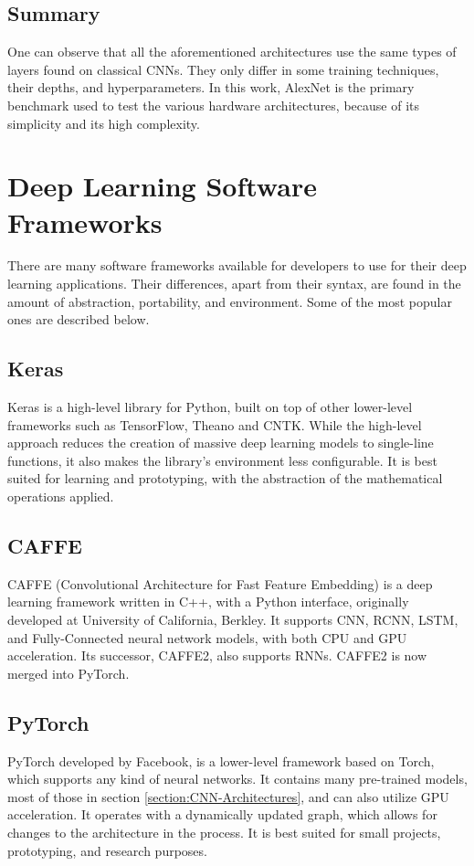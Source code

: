 \subsection{Summary}
One can observe that all the aforementioned architectures use the same types of layers found on classical CNNs. They only differ in some training techniques, their depths, and hyperparameters. In this work, AlexNet is the primary benchmark used to test the various hardware architectures, because of its simplicity and its high complexity.

\section{Deep Learning Software Frameworks}
There are many software frameworks available for developers to use for their deep learning applications. Their differences, apart from their syntax, are found in the amount of abstraction, portability, and environment. Some of the most popular ones are described below.

\subsection{Keras}
Keras \cite{Keras-Official-site} \cite{Keras-Wikipedia} is a high-level library for Python, built on top of other lower-level frameworks such as TensorFlow, Theano and CNTK. While the high-level approach reduces the creation of massive deep learning models to single-line functions, it also makes the library's environment less configurable. It is best suited for learning and prototyping, with the abstraction of the mathematical operations applied.

\subsection{CAFFE}
CAFFE (Convolutional Architecture for Fast Feature Embedding) \cite{Caffe-Convolutional-Architecture-for-Fast-Feature-Embedding} \cite{Caffe-Official-site} \cite{Caffe-Wikipedia} is a deep learning framework written in C++, with a Python interface, originally developed at University of California, Berkley. It supports CNN, RCNN, LSTM, and Fully-Connected neural network models, with both CPU and GPU acceleration. Its successor, CAFFE2, also supports RNNs. CAFFE2 is now merged into PyTorch.

\subsection{PyTorch}
PyTorch \cite{PyTorch-Official-site} \cite{PyTorch-Wikipedia} developed by Facebook, is a lower-level framework based on Torch, which supports any kind of neural networks. It contains many pre-trained models, most of those in section \ref{section:CNN-Architectures}, and can also utilize GPU acceleration. It operates with a dynamically updated graph, which allows for changes to the architecture in the process. It is best suited for small projects, prototyping, and research purposes.

